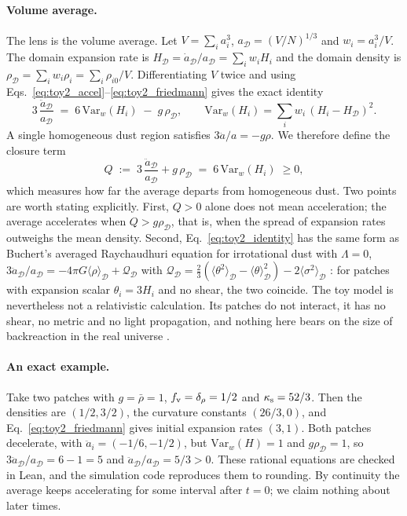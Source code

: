 \documentclass[11pt]{article}
\theoremstyle{plain}
\theoremstyle{definition}
\theoremstyle{remark}
\begin{document}
\paragraph{Volume average.}
The lens is the volume average. Let $V=\sum_i a_i^3$, $a_{\mathcal D}=(V/N)^{1/3}$ and $w_i=a_i^3/V$. The domain expansion rate is $H_{\mathcal D}=\dot a_{\mathcal D}/a_{\mathcal D}=\sum_i w_iH_i$ and the domain density is $\rho_{\mathcal D}=\sum_i w_i\rho_i=\sum_i\rho_{i0}/V$. Differentiating $V$ twice and using Eqs.~\eqref{eq:toy2_accel}--\eqref{eq:toy2_friedmann} gives the exact identity
\begin{equation}
3\,\frac{\ddot a_{\mathcal D}}{a_{\mathcal D}} \;=\; 6\,\mathrm{Var}_w(H_i)\;-\;g\,\rho_{\mathcal D},
\qquad
\mathrm{Var}_w(H_i)=\sum_i w_i\,(H_i-H_{\mathcal D})^2 .
\label{eq:toy2_identity}
\end{equation}
A single homogeneous dust region satisfies $3\ddot a/a=-g\rho$. We therefore define the closure term
\begin{equation}
Q \;:=\; 3\,\frac{\ddot a_{\mathcal D}}{a_{\mathcal D}}+g\,\rho_{\mathcal D} \;=\; 6\,\mathrm{Var}_w(H_i)\;\ge 0,
\label{eq:toy2_Q}
\end{equation}
which measures how far the average departs from homogeneous dust. Two points are worth stating explicitly. First, $Q>0$ alone does not mean acceleration; the average accelerates when $Q>g\rho_{\mathcal D}$, that is, when the spread of expansion rates outweighs the mean density. Second, Eq.~\eqref{eq:toy2_identity} has the same form as Buchert's averaged Raychaudhuri equation for irrotational dust with $\Lambda=0$, $3\ddot a_{\mathcal D}/a_{\mathcal D}=-4\pi G\langle\rho\rangle_{\mathcal D}+\mathcal Q_{\mathcal D}$ with $\mathcal Q_{\mathcal D}=\tfrac23(\langle\theta^2\rangle_{\mathcal D}-\langle\theta\rangle_{\mathcal D}^2)-2\langle\sigma^2\rangle_{\mathcal D}$ \cite{Buchert2000Dust}: for patches with expansion scalar $\theta_i=3H_i$ and no shear, the two coincide. The toy model is nevertheless not a relativistic calculation. Its patches do not interact, it has no shear, no metric and no light propagation, and nothing here bears on the size of backreaction in the real universe \cite{GreenWald2014FLRW}.

\paragraph{An exact example.}
Take two patches with $g=\bar\rho=1$, $f_{\rm v}=\delta_\rho=1/2$ and $\kappa_{\rm s}=52/3$. Then the densities are $(1/2,3/2)$, the curvature constants $(26/3,0)$, and Eq.~\eqref{eq:toy2_friedmann} gives initial expansion rates $(3,1)$. Both patches decelerate, with $\ddot a_i=(-1/6,-1/2)$, but $\mathrm{Var}_w(H)=1$ and $g\rho_{\mathcal D}=1$, so $3\ddot a_{\mathcal D}/a_{\mathcal D}=6-1=5$ and $\ddot a_{\mathcal D}/a_{\mathcal D}=5/3>0$. These rational equations are checked in Lean, and the simulation code reproduces them to rounding. By continuity the average keeps accelerating for some interval after $t=0$; we claim nothing about later times.
\end{document}
